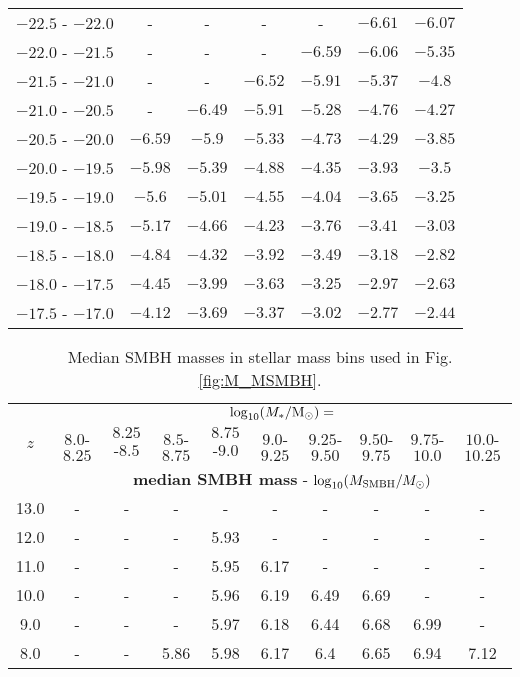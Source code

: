 \begin{table*}
\begin{tabular}{ccccccc}
 $ -22.5$ - $-22.0 $  & - & - & - & - & $-6.61$ & $-6.07$\\
 $ -22.0$ - $-21.5 $  & - & - & - & $-6.59$ & $-6.06$ & $-5.35$\\
 $ -21.5$ - $-21.0 $  & - & - & $-6.52$ & $-5.91$ & $-5.37$ & $-4.8$\\
 $ -21.0$ - $-20.5 $  & - & $-6.49$ & $-5.91$ & $-5.28$ & $-4.76$ & $-4.27$\\
 $ -20.5$ - $-20.0 $  & $-6.59$ & $-5.9$ & $-5.33$ & $-4.73$ & $-4.29$ & $-3.85$\\
 $ -20.0$ - $-19.5 $  & $-5.98$ & $-5.39$ & $-4.88$ & $-4.35$ & $-3.93$ & $-3.5$\\
 $ -19.5$ - $-19.0 $  & $-5.6$ & $-5.01$ & $-4.55$ & $-4.04$ & $-3.65$ & $-3.25$\\
 $ -19.0$ - $-18.5 $  & $-5.17$ & $-4.66$ & $-4.23$ & $-3.76$ & $-3.41$ & $-3.03$\\
 $ -18.5$ - $-18.0 $  & $-4.84$ & $-4.32$ & $-3.92$ & $-3.49$ & $-3.18$ & $-2.82$\\
 $ -18.0$ - $-17.5 $  & $-4.45$ & $-3.99$ & $-3.63$ & $-3.25$ & $-2.97$ & $-2.63$\\
 $ -17.5$ - $-17.0 $  & $-4.12$ & $-3.69$ & $-3.37$ & $-3.02$ & $-2.77$ & $-2.44$\\
\hline
\end{tabular}
\end{table*}






\begin{table*}
\caption{Median SMBH masses in stellar mass bins used in Fig. \ref{fig:M_MSMBH}.}
\label{tab:SMBH}
\begin{tabular}{cccccccccc}
\hline
    & \multicolumn{9}{c}{$\log_{10}(M_*/{\rm M_{\odot}})=$} \\
$z$ & $8.0$-$8.25$ & $8.25$-$8.5$ & $8.5$-$8.75$ & $8.75$-$9.0$ & $9.0$-$9.25$ & $9.25$-$9.50$ & $9.50$-$9.75$ & $9.75$-$10.0$ & $10.0$-$10.25$ \\
\hline
    & \multicolumn{9}{c}{{\bf median SMBH mass} - $\log_{10}(M_{\rm SMBH}/M_{\odot})$} \\
\hline
 13.0 & - & - & - & - & - & - & - & - & -\\
 12.0 & - & - & - & 5.93 & - & - & - & - & -\\
 11.0 & - & - & - & 5.95 & 6.17 & - & - & - & -\\
 10.0 & - & - & - & 5.96 & 6.19 & 6.49 & 6.69 & - & -\\
 9.0 & - & - & - & 5.97 & 6.18 & 6.44 & 6.68 & 6.99 & -\\
 8.0 & - & - & 5.86 & 5.98 & 6.17 & 6.4 & 6.65 & 6.94 & 7.12\\
 \hline
\end{tabular}
\end{table*}




